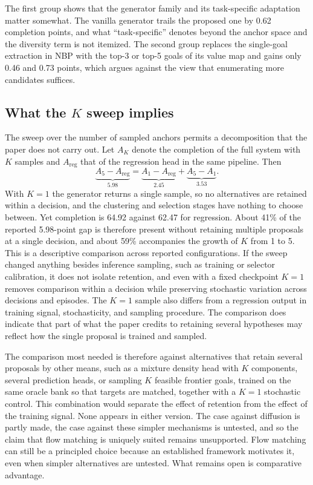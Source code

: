 \documentclass[11pt]{article}
\theoremstyle{plain}
\theoremstyle{remark}
\begin{document}
The first group shows that the generator family and its task-specific adaptation matter somewhat. The vanilla generator trails the proposed one by 0.62 completion points, and what ``task-specific'' denotes beyond the anchor space and the diversity term is not itemized. The second group replaces the single-goal extraction in NBP with the top-3 or top-5 goals of its value map and gains only 0.46 and 0.73 points, which argues against the view that enumerating more candidates suffices.

\subsection{What the $K$ sweep implies}

The sweep over the number of sampled anchors permits a decomposition that the paper does not carry out. Let $A_K$ denote the completion of the full system with $K$ samples and $A_{\mathrm{reg}}$ that of the regression head in the same pipeline. Then
\[
\underbrace{A_5-A_{\mathrm{reg}}}_{5.98}=\underbrace{A_1-A_{\mathrm{reg}}}_{2.45}+\underbrace{A_5-A_1}_{3.53}.
\]
With $K=1$ the generator returns a single sample, so no alternatives are retained within a decision, and the clustering and selection stages have nothing to choose between. Yet completion is 64.92 against 62.47 for regression. About 41\% of the reported 5.98-point gap is therefore present without retaining multiple proposals at a single decision, and about 59\% accompanies the growth of $K$ from 1 to 5. This is a descriptive comparison across reported configurations. If the sweep changed anything besides inference sampling, such as training or selector calibration, it does not isolate retention, and even with a fixed checkpoint $K=1$ removes comparison within a decision while preserving stochastic variation across decisions and episodes. The $K=1$ sample also differs from a regression output in training signal, stochasticity, and sampling procedure. The comparison does indicate that part of what the paper credits to retaining several hypotheses may reflect how the single proposal is trained and sampled.

The comparison most needed is therefore against alternatives that retain several proposals by other means, such as a mixture density head with $K$ components, several prediction heads, or sampling $K$ feasible frontier goals, trained on the same oracle bank so that targets are matched, together with a $K=1$ stochastic control. This combination would separate the effect of retention from the effect of the training signal. None appears in either version. The case against diffusion is partly made, the case against these simpler mechanisms is untested, and so the claim that flow matching is uniquely suited remains unsupported. Flow matching can still be a principled choice because an established framework motivates it, even when simpler alternatives are untested. What remains open is comparative advantage.
\end{document}
